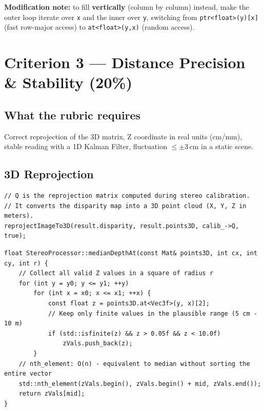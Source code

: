 \documentclass[11pt,a4paper]{article}
\begin{document}
\noindent\textbf{Modification note:} to fill \textbf{vertically} (column by column) instead,
make the outer loop iterate over \texttt{x} and the inner over \texttt{y}, switching from
\texttt{ptr<float>(y)[x]} (fast row-major access) to \texttt{at<float>(y,x)} (random access).

\section{Criterion 3 --- Distance Precision \& Stability (20\%)}

\subsection*{What the rubric requires}
Correct reprojection of the 3D matrix, Z coordinate in real units (cm/mm),
stable reading with a 1D Kalman Filter, fluctuation $\leq \pm 3\,\text{cm}$ in a static scene.

\subsection*{3D Reprojection}

\begin{lstlisting}[caption={Step 7: reprojectImageTo3D (line 131)}]
// Q is the reprojection matrix computed during stereo calibration.
// It converts the disparity map into a 3D point cloud (X, Y, Z in meters).
reprojectImageTo3D(result.disparity, result.points3D, calib_->Q, true);
\end{lstlisting}

\begin{lstlisting}[caption={Robust measurement: median over a 10x10 px region}]
float StereoProcessor::medianDepthAt(const Mat& points3D, int cx, int cy, int r) {
    // Collect all valid Z values in a square of radius r
    for (int y = y0; y <= y1; ++y)
        for (int x = x0; x <= x1; ++x) {
            const float z = points3D.at<Vec3f>(y, x)[2];
            // Keep only finite values in the plausible range (5 cm - 10 m)
            if (std::isfinite(z) && z > 0.05f && z < 10.0f)
                zVals.push_back(z);
        }
    // nth_element: O(n) - equivalent to median without sorting the entire vector
    std::nth_element(zVals.begin(), zVals.begin() + mid, zVals.end());
    return zVals[mid];
}
\end{lstlisting}
\end{document}
